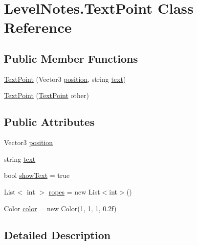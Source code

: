 \hypertarget{class_level_notes_1_1_text_point}{}\section{Level\+Notes.\+Text\+Point Class Reference}
\label{class_level_notes_1_1_text_point}
\subsection*{Public Member Functions}
\begin{DoxyCompactItemize}
\item 
\mbox{\hyperlink{class_level_notes_1_1_text_point_a9cc1f1fd4109a45c444c9817f3c6331d}{Text\+Point}} (Vector3 \mbox{\hyperlink{class_level_notes_1_1_text_point_a955028013ece3a07d4f4048021e677a0}{position}}, string \mbox{\hyperlink{class_level_notes_1_1_text_point_a837d0ff8d8587790f2b93640eb6cbf9e}{text}})
\item 
\mbox{\hyperlink{class_level_notes_1_1_text_point_a539fca9ff9c038549c93ac9f804c3da4}{Text\+Point}} (\mbox{\hyperlink{class_level_notes_1_1_text_point}{Text\+Point}} other)
\end{DoxyCompactItemize}
\subsection*{Public Attributes}
\begin{DoxyCompactItemize}
\item 
Vector3 \mbox{\hyperlink{class_level_notes_1_1_text_point_a955028013ece3a07d4f4048021e677a0}{position}}
\item 
string \mbox{\hyperlink{class_level_notes_1_1_text_point_a837d0ff8d8587790f2b93640eb6cbf9e}{text}}
\item 
bool \mbox{\hyperlink{class_level_notes_1_1_text_point_aa15313a51da349a12d03b8652ad716e7}{show\+Text}} = true
\item 
List$<$ int $>$ \mbox{\hyperlink{class_level_notes_1_1_text_point_ad8c82fd212c602ce1b194a885fae8523}{ropes}} = new List$<$int$>$()
\item 
Color \mbox{\hyperlink{class_level_notes_1_1_text_point_ae3819efedf9831cf8968b26594aac064}{color}} = new Color(1, 1, 1, 0.\+2f)
\end{DoxyCompactItemize}


\subsection{Detailed Description}


